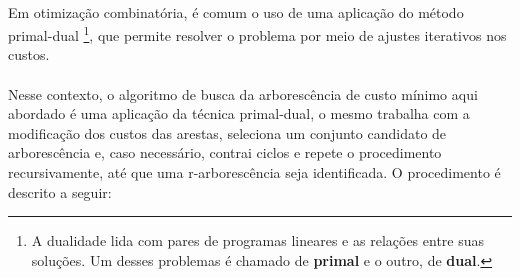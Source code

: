 \documentclass[12pt,a4paper]{article}
\begin{document}
\paragraph{}
Em otimização combinatória, é comum o uso de uma aplicação do método primal-dual \footnote{
A dualidade lida com pares de programas lineares e as relações entre suas soluções. Um desses problemas é chamado de \textbf{primal} e o outro, de \textbf{dual}.}, que permite resolver o problema por meio de ajustes iterativos nos custos.





\paragraph{}
Nesse contexto, o algoritmo de busca da arborescência de custo mínimo aqui abordado é uma aplicação da técnica primal-dual, o mesmo trabalha com a modificação dos custos das arestas, seleciona um conjunto candidato de arborescência e, caso necessário, contrai ciclos e repete o procedimento recursivamente, até que uma r-arborescência seja identificada. O procedimento é descrito a seguir:
\end{document}
